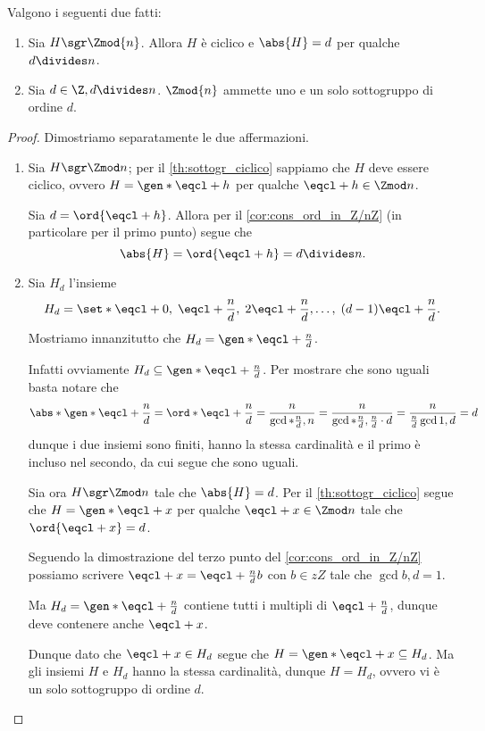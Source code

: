 \begin{proposition}
     \label{prop:sgr_Z/nZ}
    Valgono i seguenti due fatti:
    \begin{enumerate}[label={(\roman*)}, ref={\theproposition: (\roman*)}]
        \item \label{prop:sgr_Z/nZ:ciclico_ord_d} Sia $H \sgr \Zmod{n}$. Allora $H$ è ciclico e $\abs{H} = d$ per qualche $d \divides n$.
        \item \label{prop:sgr_Z/nZ:unosolo_ord_d} Sia $d \in \Z, d \divides n$. $\Zmod{n}$ ammette uno e un solo sottogruppo di ordine $d$.
    \end{enumerate}
\end{proposition}
\begin{proof}
    Dimostriamo separatamente le due affermazioni.
    \begin{enumerate} [label={(\roman*)}]
        \item Sia $H \sgr \Zmod n$; per il \autoref{th:sottogr_ciclico} sappiamo che $H$ deve essere ciclico, ovvero $H = \gen*{\eqcl+ h}$ per qualche $\eqcl+ h \in \Zmod n$.
        
        Sia $d = \ord{\eqcl+ h}$. Allora per il \autoref{cor:cons_ord_in_Z/nZ} (in particolare per il primo punto) segue che \[
            \abs{H} = \ord{\eqcl+ h} = d \divides n.   
        \]
        \item Sia $H_d$ l'insieme \[
            H_d = \set*{\eqcl+ 0,\; \eqcl+{\frac{n}{d}},\; 2\eqcl+{\frac{n}{d}}, \dots,\; (d-1)\eqcl+{\frac{n}{d}}}.    
        \] Mostriamo innanzitutto che $H_d = \gen*{\eqcl+{\frac{n}{d}}}$.
        
        Infatti ovviamente $H_d \subseteq \gen*{\eqcl+{\frac{n}{d}}}$. Per mostrare che sono uguali basta notare che \[
            \abs*{\gen*{\eqcl+{\frac{n}{d}}}} = 
            \ord*{\eqcl+{\frac{n}{d}}} = 
            \frac{n}{\gcd*{\frac{n}{d}, n}} = 
            \frac{n}{\gcd*{\frac{n}{d}, \frac{n}{d} \cdot d}} = 
            \frac{n}{\frac{n}{d}\gcd{1, d}} = 
            d
        \] dunque i due insiemi sono finiti, hanno la stessa cardinalità e il primo è incluso nel secondo, da cui segue che sono uguali.

        Sia ora $H \sgr \Zmod n$ tale che $\abs{H} = d$. Per il \autoref{th:sottogr_ciclico} segue che $H = \gen*{\eqcl+ x}$ per qualche $\eqcl+ x \in \Zmod n$ tale che $\ord{\eqcl+ x} = d$.

        Seguendo la dimostrazione del terzo punto del \autoref{cor:cons_ord_in_Z/nZ} possiamo scrivere $\eqcl+ x = \eqcl+{\frac{n}{d}}b$ con $b \in zZ$ tale che $\gcd{b, d} = 1$.

        Ma $H_d = \gen*{\eqcl+{\frac{n}{d}}}$ contiene tutti i multipli di $\eqcl+{\frac{n}{d}}$, dunque deve contenere anche $\eqcl+ x$.

        Dunque dato che $\eqcl+ x \in H_d$ segue che $H = \gen*{\eqcl+ x} \subseteq H_d$. Ma gli insiemi $H$ e $H_d$ hanno la stessa cardinalità, dunque $H = H_d$, ovvero vi è un solo sottogruppo di ordine $d$. \qedhere
    \end{enumerate}
\end{proof}
